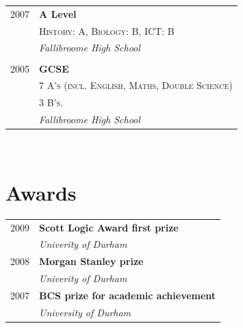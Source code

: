 \documentclass[10pt]{article} %
\begin{document}
{\begin{minipage}[t]{0.44\textwidth}
\begin{tabular}{rl}

2007 & \textbf{A Level}\\
& \textsc{History: A, Biology: B, ICT: B}\\
& \textit{Fallibroome High School}\\
&\\
	 

2005 & \textbf{GCSE}\\
& \textsc{7 A’s (incl. English, Maths, Double Science)} \\
& \textsc{3 B’s.} \\
& \textit{Fallibroome High School} 
	

\end{tabular}\\[10pt]


\section{Awards} 

\begin{tabular}{rl}

2009	 & \textbf{Scott Logic Award first prize}\\
& \textit{Univerity of Durham}\\

2008	 & \textbf{Morgan Stanley prize}\\
& \textit{Univerity of Durham}\\

2007	 & \textbf{BCS prize for academic achievement}\\
& \textit{University of Durham}\\

\end{tabular}\\[10pt]




\end{minipage}}
\end{document}
